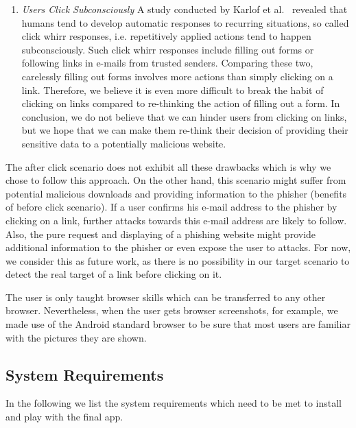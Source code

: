 \begin{description}[leftmargin=0cm]
\begin{enumerate}
\item \textit{Users Click Subconsciously} A study conducted by Karlof et al.~\cite{karlof2009conditioned} revealed that humans tend to develop automatic responses to recurring situations, so called click whirr responses, i.e. repetitively applied actions tend to happen subconsciously. Such click whirr responses include filling out forms or following links in e-mails from trusted senders. Comparing these two, carelessly filling out forms involves more actions than simply clicking on a link.
Therefore, we believe it is even more difficult to break the habit of clicking on links compared to re-thinking the action of filling out a form.
In conclusion, we do not believe that we can hinder users from clicking on links, but we hope that we can make them re-think their decision of providing their sensitive data to a potentially malicious website.
\end{enumerate}

The after click scenario does not exhibit all these drawbacks which is why we chose to follow this approach.
On the other hand, this scenario might suffer from potential malicious downloads and providing information to the phisher (benefits of before click scenario).
If a user confirms his e-mail address to the phisher by clicking on a link, further attacks towards this e-mail address are likely to follow.
Also, the pure request and displaying of a phishing website might provide additional information to the phisher or even expose the user to attacks.
For now, we consider this as future work, as there is no possibility in our target scenario to detect the real target of a link before clicking on it.

	\item[Considered Browser] The user is only taught browser skills which can be transferred to any other browser.
Nevertheless, when the user gets browser screenshots, for example, we made use of the Android standard browser to be sure that most users are familiar with the pictures they are shown.
\end{description}	

\subsection{System Requirements}
\label{s:sys_requirements}
In the following we list the system requirements which need to be met to install and play with the final app.


